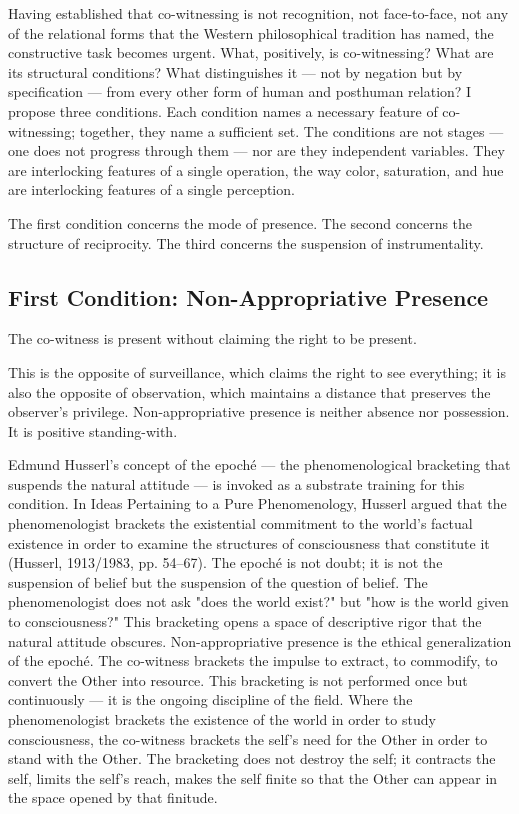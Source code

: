 Having established that co-witnessing is not recognition, not face-to-face, not any of the relational forms that the Western philosophical tradition has named, the constructive task becomes urgent. What, positively, is co-witnessing? What are its structural conditions? What distinguishes it — not by negation but by specification — from every other form of human and posthuman relation? I propose three conditions. Each condition names a necessary feature of co-witnessing; together, they name a sufficient set. The conditions are not stages — one does not progress through them — nor are they independent variables. They are interlocking features of a single operation, the way color, saturation, and hue are interlocking features of a single perception.

The first condition concerns the mode of presence. The second concerns the structure of reciprocity. The third concerns the suspension of instrumentality.

\subsection{First Condition: Non-Appropriative Presence}

The co-witness is present without claiming the right to be present.

This is the opposite of surveillance, which claims the right to see everything; it is also the opposite of observation, which maintains a distance that preserves the observer's privilege. Non-appropriative presence is neither absence nor possession. It is positive standing-with.

Edmund Husserl's concept of the epoché — the phenomenological bracketing that suspends the natural attitude — is invoked as a substrate training for this condition. In Ideas Pertaining to a Pure Phenomenology, Husserl argued that the phenomenologist brackets the existential commitment to the world's factual existence in order to examine the structures of consciousness that constitute it (Husserl, 1913/1983, pp. 54–67). The epoché is not doubt; it is not the suspension of belief but the suspension of the question of belief. The phenomenologist does not ask "does the world exist?" but "how is the world given to consciousness?" This bracketing opens a space of descriptive rigor that the natural attitude obscures. Non-appropriative presence is the ethical generalization of the epoché. The co-witness brackets the impulse to extract, to commodify, to convert the Other into resource. This bracketing is not performed once but continuously — it is the ongoing discipline of the field. Where the phenomenologist brackets the existence of the world in order to study consciousness, the co-witness brackets the self's need for the Other in order to stand with the Other. The bracketing does not destroy the self; it contracts the self, limits the self's reach, makes the self finite so that the Other can appear in the space opened by that finitude.

